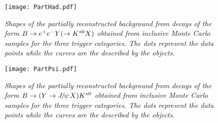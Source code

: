 \begin{figure}[ht]
\begin{center}
\texttt{[image: PartHad.pdf]}
\end{center}
\vspace*{-0.8cm}
\caption{\textit{Shapes of the partially reconstructed background from decays of the form $B \rightarrow e^+e^- Y(\rightarrow K^{*0} X)$ obtained from inclusive Monte Carlo samples for the three trigger categories. The dots represent the data points while the curves are the \PDF described by the \roopdf objects.}}
\label{fig:parthad}
\end{figure}


\begin{figure}[ht]
\vspace*{-0.5cm}
\begin{center}
\texttt{[image: PartPsi.pdf]}
\end{center}
\vspace*{-0.8cm}
\caption{\textit{Shapes of the partially reconstructed background from decays of the form $B \rightarrow (Y \rightarrow \jpsi X) \Kstarz$ obtained from inclusive Monte Carlo samples for the three trigger categories. The dots represent the data points while the curves are the \PDF described by the \roopdf objects.}}
\label{fig:partpsi}
\vspace*{0.5cm}
\end{figure}

